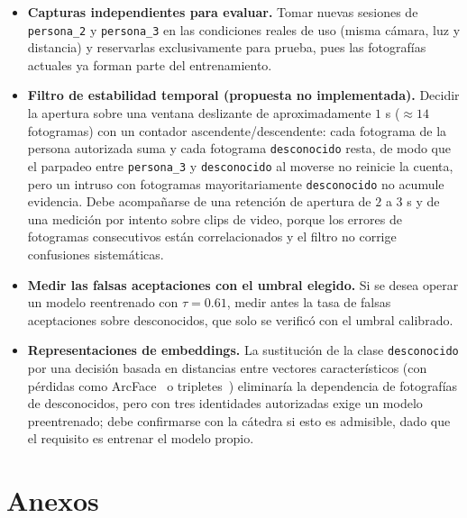\documentclass{article}
\begin{document}
\begin{itemize}
    \item \textbf{Capturas independientes para evaluar.} Tomar nuevas sesiones de \texttt{persona\_2} y \texttt{persona\_3} en las condiciones reales de uso (misma cámara, luz y distancia) y reservarlas exclusivamente para prueba, pues las fotografías actuales ya forman parte del entrenamiento.
    \item \textbf{Filtro de estabilidad temporal (propuesta no implementada).} Decidir la apertura sobre una ventana deslizante de aproximadamente $1$ s ($\approx 14$ fotogramas) con un contador ascendente/descendente: cada fotograma de la persona autorizada suma y cada fotograma \texttt{desconocido} resta, de modo que el parpadeo entre \texttt{persona\_3} y \texttt{desconocido} al moverse no reinicie la cuenta, pero un intruso con fotogramas mayoritariamente \texttt{desconocido} no acumule evidencia. Debe acompañarse de una retención de apertura de $2$ a $3$ s y de una medición por intento sobre clips de video, porque los errores de fotogramas consecutivos están correlacionados y el filtro no corrige confusiones sistemáticas.
    \item \textbf{Medir las falsas aceptaciones con el umbral elegido.} Si se desea operar un modelo reentrenado con $\tau = 0.61$, medir antes la tasa de falsas aceptaciones sobre desconocidos, que solo se verificó con el umbral calibrado.
    \item \textbf{Representaciones de embeddings.} La sustitución de la clase \texttt{desconocido} por una decisión basada en distancias entre vectores característicos (con pérdidas como ArcFace~\cite{deng2019arcface} o tripletes~\cite{schroff2015facenet}) eliminaría la dependencia de fotografías de desconocidos, pero con tres identidades autorizadas exige un modelo preentrenado; debe confirmarse con la cátedra si esto es admisible, dado que el requisito es entrenar el modelo propio.
\end{itemize}


\printbibliography[heading=bibintoc, title={Referencias Bibliográficas}]

\section{Anexos}
\end{document}
